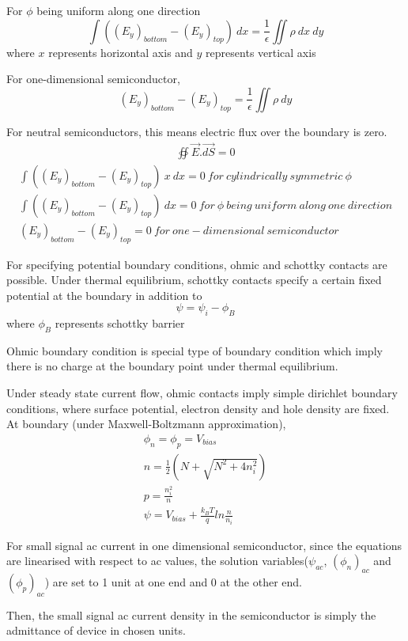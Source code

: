 For $\phi$ being uniform along one direction
\begin{equation}
\int ((E_y)_{bottom} - (E_y)_{top}) \ dx  = \frac{1}{\epsilon} \iint \rho\ dx\ dy \tag{1.19}\label{eq:16}
\end{equation}
where $x$ represents horizontal axis and $y$ represents vertical axis

For one-dimensional semiconductor, 
\begin{equation}
(E_y)_{bottom} - (E_y)_{top}  = \frac{1}{\epsilon} \iint \rho\ dy \tag{1.20}\label{eq:17}
\end{equation}

For neutral semiconductors, this means electric flux over the boundary is zero. 
\begin{align*}	
   \oiint \vec{E}.\vec{dS} =  0
\end{align*}
\begin{align*}   
\int ((E_y)_{bottom} - (E_y)_{top})\ x \ dx  = 0\ for\ cylindrically\ symmetric\ \phi \\
\int ((E_y)_{bottom} - (E_y)_{top}) \ dx  = 0\ for\ \phi\ being\ uniform\ along\ one\ direction \\
(E_y)_{bottom} - (E_y)_{top}  = 0\ for\ one-dimensional\ semiconductor
   \tag{1.21} \label{eq:18}
\end{align*}

For specifying potential boundary conditions, ohmic and schottky contacts are possible. 
Under thermal equilibrium, schottky contacts specify a certain fixed potential at the boundary in addition to 
\begin{equation}
   \psi = \psi_i - \phi_B \tag{1.21} \label{eq:19}
\end{equation}
where $\phi_B$ represents schottky barrier 

Ohmic boundary condition is special type of boundary condition which imply there is no charge at the boundary point under thermal equilibrium. 

Under steady state current flow, ohmic contacts imply simple dirichlet boundary conditions, where surface
potential, electron density and hole density are fixed.
At boundary (under Maxwell-Boltzmann approximation),
\begin{align*}
\phi_n = \phi_p = V_{bias} \\
n = \frac{1}{2}({N + \sqrt{N^2 + 4n_i^2}}) \\
p = \frac{n_i^2}{n} \\ 
\psi = V_{bias} + \frac{k_BT}{q} ln\frac{n}{n_i} \tag{1.22} \label{eq:20}
\end{align*}

For small signal ac current in one dimensional semiconductor, since the equations are linearised with respect to ac values, the solution variables($\psi_{ac}$, $(\phi_n)_{ac}$ and $(\phi_p)_{ac}$) are set to 1 unit at one end and 0 at the other end.

Then, the small signal ac current density in the semiconductor is simply the admittance of device in chosen units.